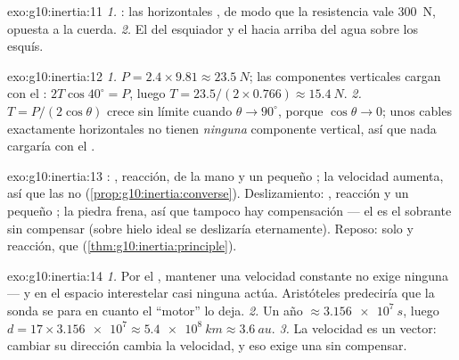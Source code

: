 \begin{solution}{exo:g10:inertia:11}
\emph{1.} : las  horizontales , de modo que la resistencia vale \qty{300}{N}, opuesta a la
cuerda. \emph{2.} El  del esquiador y el  hacia arriba del
agua sobre los esquís.
\end{solution}

\begin{solution}{exo:g10:inertia:12}
\emph{1.} $P = 2.4 \times 9.81 \approx \qty{23.5}{N}$; las componentes
verticales cargan con el : $2T\cos 40^\circ = P$, luego
$T = 23.5/(2 \times 0.766) \approx \qty{15.4}{N}$. \emph{2.}
$T = P/(2\cos\theta)$ crece sin límite cuando $\theta \to 90^\circ$,
porque $\cos\theta \to 0$; unos cables exactamente horizontales no
tienen \emph{ninguna} componente vertical, así que nada cargaría con el
.
\end{solution}

\begin{solution}{exo:g10:inertia:13}
: , reacción,  de la mano y un pequeño ; la
velocidad aumenta, así que las  no 
(\cref{prop:g10:inertia:converse}). Deslizamiento: , reacción y un
pequeño ; la piedra frena, así que tampoco hay compensación
--- el  es el sobrante sin compensar (sobre hielo ideal se
deslizaría eternamente). Reposo: solo  y reacción, que 
(\cref{thm:g10:inertia:principle}).
\end{solution}

\begin{solution}{exo:g10:inertia:14}
\emph{1.} Por el , mantener una velocidad constante
no exige ninguna  --- y en el espacio interestelar casi ninguna
actúa. Aristóteles predeciría que la sonda se para en cuanto el ``motor''
lo deja. \emph{2.} Un año $\approx \qty{3.156e7}{s}$, luego
$d = 17 \times \num{3.156e7} \approx \qty{5.4e8}{km} \approx
\qty{3.6}{au}$. \emph{3.} La velocidad es un vector: cambiar su
dirección cambia la velocidad, y eso exige una  sin compensar.
\end{solution}

